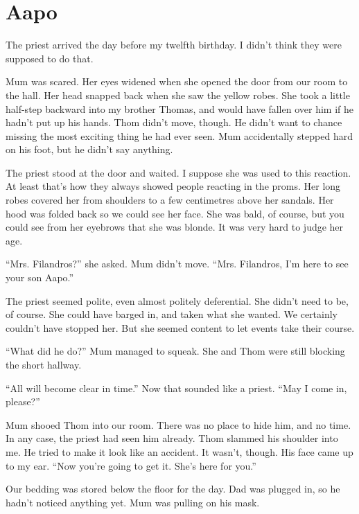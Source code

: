 %
%

\chapter{Aapo}

The priest arrived the day before my twelfth birthday. I didn't think they were supposed to do that.

Mum was scared. Her eyes widened when she opened the door from our room to the hall. Her head snapped back when she saw the yellow robes. She took a little half-step backward into my brother Thomas, and would have fallen over him if he hadn't put up his hands. Thom didn't move, though. He didn't want to chance missing the most exciting thing he had ever seen. Mum accidentally stepped hard on his foot, but he didn't say anything.

The priest stood at the door and waited. I suppose she was used to this reaction. At least that's how they always showed people reacting in the proms. Her long robes covered her from shoulders to a few centimetres above her sandals. Her hood was folded back so we could see her face. She was bald, of course, but you could see from her eyebrows that she was blonde. It was very hard to judge her age.

``Mrs. Filandros?'' she asked. Mum didn't move. ``Mrs. Filandros, I'm here to see your son Aapo.''

The priest seemed polite, even almost politely deferential. She didn't need to be, of course. She could have barged in, and taken what she wanted. We certainly couldn't have stopped her. But she seemed content to let events take their course.

``What did he do?'' Mum managed to squeak. She and Thom were still blocking the short hallway.

``All will become clear in time.'' Now that sounded like a priest. ``May I come in, please?''

Mum shooed Thom into our room. There was no place to hide him, and no time. In any case, the priest had seen him already. Thom slammed his shoulder into me. He tried to make it look like an accident. It wasn't, though. His face came up to my ear. ``Now you're going to get it. She's here for you.''

Our bedding was stored below the floor for the day. Dad was plugged in, so he hadn't noticed anything yet. Mum was pulling on his mask.

